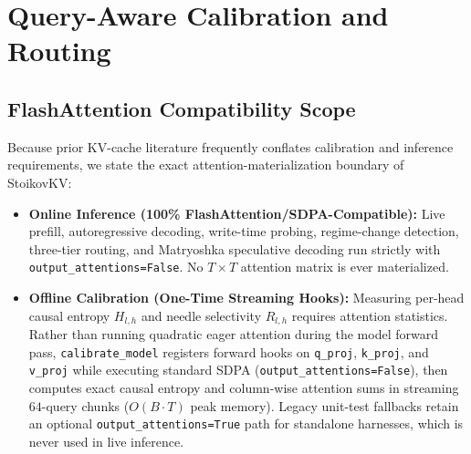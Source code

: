 \documentclass[conference]{IEEEtran}
\begin{document}
\section{Query-Aware Calibration and Routing}

\subsection{FlashAttention Compatibility Scope}
Because prior KV-cache literature frequently conflates calibration and inference requirements, we state the exact attention-materialization boundary of StoikovKV:
\begin{itemize}
    \item \textbf{Online Inference (100\% FlashAttention/SDPA-Compatible):} Live prefill, autoregressive decoding, write-time probing, regime-change detection, three-tier routing, and Matryoshka speculative decoding run strictly with \texttt{output\_attentions=False}. No $T \times T$ attention matrix is ever materialized.
    \item \textbf{Offline Calibration (One-Time Streaming Hooks):} Measuring per-head causal entropy $H_{l,h}$ and needle selectivity $R_{l,h}$ requires attention statistics. Rather than running quadratic eager attention during the model forward pass, \texttt{calibrate\_model} registers forward hooks on \texttt{q\_proj}, \texttt{k\_proj}, and \texttt{v\_proj} while executing standard SDPA (\texttt{output\_attentions=False}), then computes exact causal entropy and column-wise attention sums in streaming $64$-query chunks ($O(B \cdot T)$ peak memory). Legacy unit-test fallbacks retain an optional \texttt{output\_attentions=True} path for standalone harnesses, which is never used in live inference.
\end{itemize}
\end{document}
